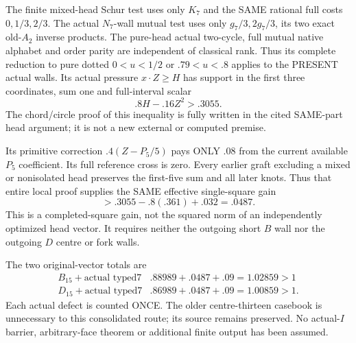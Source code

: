 The finite mixed-head Schur test uses
only \(K_7\) and the SAME rational full
costs \(0,1/3,2/3\).
The actual \(N_7\)-wall mutual test uses
only \(g_7/3,2g_7/3\), its two exact
old-\(A_2\) inverse products.
The pure-head actual two-cycle, full
mutual native alphabet and order parity
are independent of classical rank.
Thus its complete reduction to pure
dotted \(0<u<1/2\) or \(.79<u<.8\)
applies to the PRESENT actual walls.
Its actual pressure \(x\cdot Z\ge H\)
has support in the first three coordinates,
sum one and full-interval scalar
\[
                            .8H-.16Z^2>.3055 .
\]
The chord/circle proof of this inequality
is fully written in the cited SAME-part
head argument; it is not a new external
or computed premise.

Its primitive correction \(.4(Z-P_5/5)\)
pays ONLY \(.08\) from the current available
\(P_5\) coefficient.
Its full reference cross is zero.
Every earlier graft excluding a mixed
or nonisolated head preserves the first-five
sum and all later knots.
Thus that entire local proof supplies the
SAME effective single-square gain
\[
                          >.3055-.8(.361)+.032=.0487 .
\]
This is a completed-square gain, not the
squared norm of an independently optimized
head vector.
It requires neither the outgoing short
\(B\) wall nor the outgoing \(D\) centre
or fork walls.

The two original-vector totals are
\[
 \begin{array}{c|c}
 B_{15}+\text{actual typed7}&.88989+.0487+.09=1.02859>1\\
 D_{15}+\text{actual typed7}&.86989+.0487+.09=1.00859>1 .
 \end{array}
\]
Each actual defect is counted ONCE.
The older centre-thirteen casebook is
unnecessary to this consolidated route;
its source remains preserved.
No actual-\(I\) barrier, arbitrary-face
theorem or additional finite output
has been assumed.




































